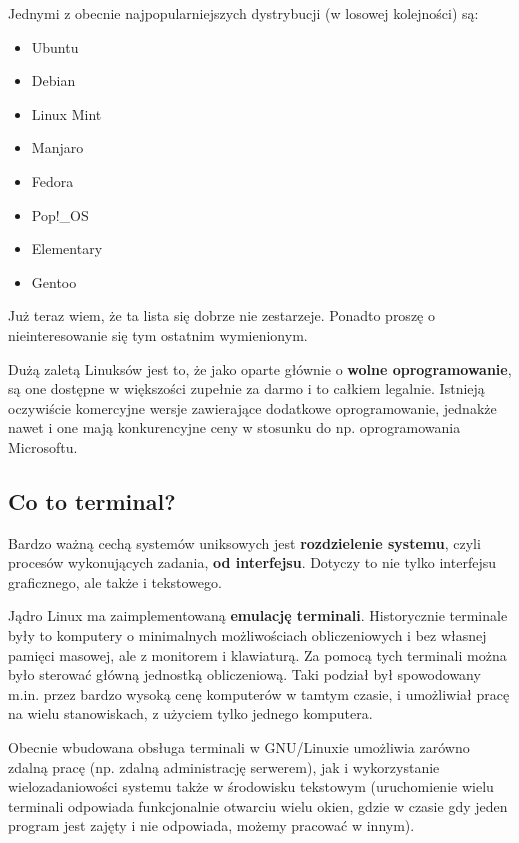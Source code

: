 \documentclass[12pt]{article}
\begin{document}
Jednymi z obecnie najpopularniejszych dystrybucji (w losowej kolejności) są:

\begin{itemize}
    \item Ubuntu
    \item Debian
    \item Linux Mint
    \item Manjaro
    \item Fedora
    \item Pop!\_OS
    \item Elementary
    \item Gentoo
\end{itemize}

Już teraz wiem, że ta lista się dobrze nie zestarzeje. Ponadto proszę o nieinteresowanie się tym ostatnim wymienionym.

Dużą zaletą Linuksów jest to, że jako oparte głównie o \textbf{wolne oprogramowanie}, są one dostępne w większości zupełnie za darmo i to całkiem legalnie. Istnieją oczywiście komercyjne wersje zawierające dodatkowe oprogramowanie, jednakże nawet i one mają konkurencyjne ceny w stosunku do np. oprogramowania Microsoftu. 

\subsection{Co to terminal?}

Bardzo ważną cechą systemów uniksowych jest \textbf{rozdzielenie systemu}, czyli procesów wykonujących zadania, \textbf{od interfejsu}. Dotyczy to nie tylko interfejsu graficznego, ale także i tekstowego.

Jądro Linux ma zaimplementowaną \textbf{emulację terminali}. Historycznie terminale były to komputery o minimalnych możliwościach obliczeniowych i bez własnej pamięci masowej, ale z monitorem i klawiaturą. Za pomocą tych terminali można było sterować główną jednostką obliczeniową. Taki podział był spowodowany m.in. przez bardzo wysoką cenę komputerów w tamtym czasie, i umożliwiał pracę na wielu stanowiskach, z użyciem tylko jednego komputera.

Obecnie wbudowana obsługa terminali w GNU/Linuxie umożliwia zarówno zdalną pracę (np. zdalną administrację serwerem), jak i wykorzystanie wielozadaniowości systemu także w środowisku tekstowym (uruchomienie wielu terminali odpowiada funkcjonalnie otwarciu wielu okien, gdzie w czasie gdy jeden program jest zajęty i nie odpowiada, możemy pracować w innym).
\end{document}
